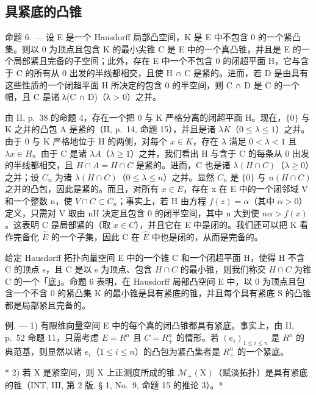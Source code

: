 \subsection{具紧底的凸锥}

命题 6. --- 设 E 是一个 Hausdorff 局部凸空间，K 是 E 中不包含 0 的一个紧凸集。则以 0 为顶点且包含 K 的最小尖锥 C 是 E 中的一个真凸锥，并且是 E 的一个局部紧且完备的子空间；此外，存在 E 中一个不包含 0 的闭超平面 H，它与含于 C 的所有从 0 出发的半线都相交，且使 H ∩ C 是紧的。进而，若 D 是由具有这些性质的一个闭超平面 H 所决定的包含 0 的半空间，则 C ∩ D 是 C 的一个帽，且 C 是诸 λ(C ∩ D)（λ \textgreater{} 0）之并。

由 II, p.~38 的命题 4，存在一个把 0 与 K 严格分离的闭超平面 H。现在，\(\{0\}\) 与 K 之并的凸包 A 是紧的（II, p.~14, 命题 15），并且是诸 \(\lambda K\)（\(0 \leqslant \lambda \leqslant 1\)）之并。由于 0 与 K 严格地位于 H 的两侧，对每个 \(x \in K\)，存在 \(\lambda\) 满足 \(0 < \lambda < 1\) 且 \(\lambda x \in H\)。由于 C 是诸 \(\lambda A\)（\(\lambda \geqslant 1\)）之并，我们看出 H 与含于 C 的每条从 0 出发的半线都相交，且 \(H \cap A = H \cap C\) 是紧的。进而，C 也是诸 \(\lambda(H \cap C)\)（\(\lambda \geqslant 0\)）之并；设 \(C_n\) 为诸 \(\lambda(H \cap C)\)（\(0 \leqslant \lambda \leqslant n\)）之并。显然 \(C_n\) 是 \(\{0\}\) 与 \(n(H \cap C)\) 之并的凸包，因此是紧的。而且，对所有 \(x \in E\)，存在 x 在 E 中的一个闭邻域 V 和一个整数 n，使 \(V \cap C \subset C_n\)；事实上，若 H 由方程 \(f(z) = \alpha\)（其中 \(\alpha > 0\)）定义，只需对 V 取由 nH 决定且包含 0 的闭半空间，其中 n 大到使 \(n\alpha > f(x)\)。这表明 C 是局部紧的（取 \(x \in C\)），并且它在 E 中是闭的。我们还可以把 K 看作完备化 \(\hat{E}\) 的一个子集，因此 C 在 \(\hat{E}\) 中也是闭的，从而是完备的。

给定 Hausdorff 拓扑向量空间 E 中的一个锥 C 和一个闭超平面 H，使得 H 不含 C 的顶点 s，且 C 是以 s 为顶点、包含 \(H \cap C\) 的最小锥，则我们称交 \(H \cap C\) 为锥 C 的一个「底」。命题 6 表明，在 Hausdorff 局部凸空间 E 中，以 0 为顶点且包含一个不含 0 的紧凸集 K 的最小锥是具有紧底的锥，并且每个具有紧底 S 的凸锥都是局部紧且完备的。

例. --- 1) 有限维向量空间 E 中的每个真的闭凸锥都具有紧底。事实上，由 II, p.~52 命题 11，只需考虑 \(E = R^{n}\) 且 \(C = R_{+}^{n}\) 的情形。若 \((e_{i})_{1 \leqslant i \leqslant n}\) 是 \(R^{n}\) 的典范基，则显然以诸 \(e_{i}\)（\(1 \leqslant i \leqslant n\)）的凸包为紧凸集者是 \(R_{+}^{n}\) 的一个紧底。

* 2) 若 X 是紧空间，则 X 上正测度所成的锥 \(\mathcal{M}_{+}(\mathrm{X})\)（赋淡拓扑）是具有紧底的锥（INT, III, 第 2 版, § 1, No.~9, 命题 15 的推论 3）。*

